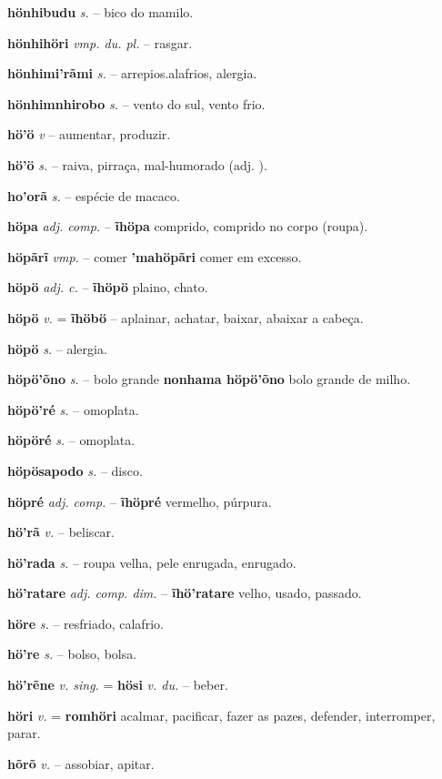 \textbf{hönhibudu} \textit{s.} -- bico do mamilo.

\textbf{hönhihöri} \textit{vmp. du. pl.} -- rasgar.

\textbf{hönhimi'rãmi} \textit{s.} -- arrepios.alafrios, alergia.

\textbf{hönhimnhirobo} \textit{s.} -- vento do sul, vento frio.

\textbf{hö'ö} \textit{v} -- aumentar, produzir.

\textbf{hö'ö} \textit{s.} -- raiva, pirraça, mal-humorado (adj. ).

\textbf{ho'orã} \textit{s.} -- espécie de macaco.

\textbf{höpa} \textit{adj. comp.} -- \textbf{ĩhöpa} comprido, comprido no corpo (roupa).

\textbf{höpãrĩ} \textit{vmp.} -- comer  \textbf{'mahöpãri} comer em excesso.

\textbf{höpö} \textit{adj. c.} -- \textbf{ĩhöpö} plaino, chato.

\textbf{höpö} \textit{v.} = \textbf{ĩhöbö} -- aplainar, achatar, baixar, abaixar a cabeça.

\textbf{höpö} \textit{s.} -- alergia.

\textbf{höpö'õno} \textit{s.} -- bolo grande  \textbf{nonhama höpö'õno} bolo grande de milho.

\textbf{höpö'ré} \textit{s.} -- omoplata.

\textbf{höpöré} \textit{s.} -- omoplata.

\textbf{höpösapodo} \textit{s.} -- disco.

\textbf{höpré} \textit{adj. comp.} -- \textbf{ĩhöpré} vermelho, púrpura.

\textbf{hö'rã} \textit{v.} -- beliscar.

\textbf{hö'rada} \textit{s.} -- roupa velha, pele enrugada, enrugado.

\textbf{hö'ratare} \textit{adj. comp. dim.} -- \textbf{ĩhö'ratare} velho, usado, passado.

\textbf{höre} \textit{s.} -- resfriado, calafrio.

\textbf{hö're} \textit{s.} -- bolso, bolsa.

\textbf{hö'rẽne} \textit{v. sing.} = \textbf{hösi} \textit{v. du.} -- beber.

\textbf{höri} \textit{v.} = \textbf{romhöri} acalmar, pacificar, fazer as pazes, defender, interromper, parar.

\textbf{hõrõ} \textit{v.} -- assobiar, apitar.

